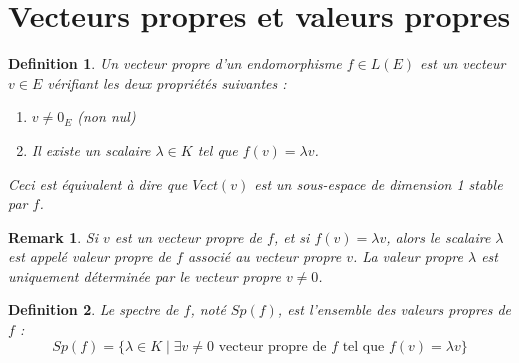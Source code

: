 \documentclass{article}
\newtheorem{definition}{Definition}
\newtheorem{remark}{Remark}
\begin{document}
\section{Vecteurs propres et valeurs propres}

\begin{definition}
Un vecteur propre d'un endomorphisme $f \in L(E)$ est un vecteur $v \in E$ vérifiant les deux propriétés suivantes :
\begin{enumerate}
    \item $v \neq 0_E$ (non nul)
    \item Il existe un scalaire $\lambda \in K$ tel que $f(v) = \lambda v$.
\end{enumerate}
Ceci est équivalent à dire que $Vect(v)$ est un sous-espace de dimension 1 stable par $f$.
\end{definition}

\begin{remark}
Si $v$ est un vecteur propre de $f$, et si $f(v) = \lambda v$, alors le scalaire $\lambda$ est appelé valeur propre de $f$ associé au vecteur propre $v$. La valeur propre $\lambda$ est uniquement déterminée par le vecteur propre $v \neq 0$.
\end{remark}

\begin{definition}
Le spectre de $f$, noté $Sp(f)$, est l'ensemble des valeurs propres de $f$ :
\[ Sp(f) = \{ \lambda \in K \mid \exists v \neq 0 \text{ vecteur propre de } f \text{ tel que } f(v) = \lambda v \} \]

\end{definition}
\end{document}
